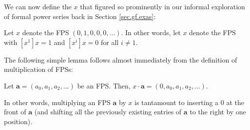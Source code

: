 We can now define the $x$ that figured so prominently in our informal
exploration of formal power series back in Section \ref{sec.gf.exas}:

\begin{definition}
\label{def.fps.x}Let $x$ denote the FPS $\left(  0,1,0,0,0,\ldots\right)  $.
In other words, let $x$ denote the FPS with $\left[  x^{1}\right]  x=1$ and
$\left[  x^{i}\right]  x=0$ for all $i\neq1$.
\end{definition}

The following simple lemma follows almost immediately from the definition of
multiplication of FPSs:

\begin{lemma}
\label{lem.fps.xa}Let $\mathbf{a}=\left(  a_{0},a_{1},a_{2},\ldots\right)  $
be an FPS. Then, $x\cdot\mathbf{a}=\left(  0,a_{0},a_{1},a_{2},\ldots\right)
$.
\end{lemma}

In other words, multiplying an FPS $\mathbf{a}$ by $x$ is tantamount to
inserting a $0$ at the front of $\mathbf{a}$ (and shifting all the previously
existing entries of $\mathbf{a}$ to the right by one position).


